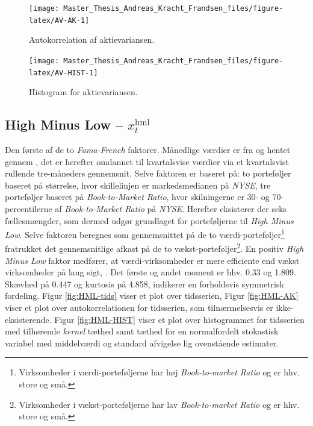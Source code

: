 \documentclass[
  a4paper,
  oneside]{memoir}
\begin{document}
\begin{figure}[H]

{\centering \texttt{[image: Master\_Thesis\_Andreas\_Kracht\_Frandsen\_files/figure-latex/AV-AK-1]} 

}

\caption{Autokorrelation af aktievariansen.}\label{fig:AV-AK}
\end{figure}

\begin{figure}[H]

{\centering \texttt{[image: Master\_Thesis\_Andreas\_Kracht\_Frandsen\_files/figure-latex/AV-HIST-1]} 

}

\caption{Histogram for aktievariansen.}\label{fig:AV-HIST}
\end{figure}

\hypertarget{datahml}{%
\subsection{\texorpdfstring{High Minus Low -- \(x_t^{\text{hml}}\)}{High Minus Low -- x\_t\^{}\{\textbackslash text\{hml\}\}}}\label{datahml}}

Den første af de to \emph{Fama-French} faktorer. Månedlige værdier er fra \citep{CRSPakt} og hentet gennem \citep{French2020}, det er herefter omdannet til kvartalsvise værdier via et kvartalsvist rullende tre-måneders gennemsnit. Selve faktoren er baseret på: to porteføljer baseret på størrelse, hvor skillelinjen er markedsmedianen på \emph{NYSE}, tre porteføljer baseret på \emph{Book-to-Market Ratio}, hvor skilningerne er \(30\)- og \(70\)-percentilerne af \emph{Book-to-Market Ratio} på \emph{NYSE}. Herefter eksisterer der seks fællesmængder, som dermed udgør grundlaget for porteføljerne til \emph{High Minus Low}. Selve faktoren beregnes som gennemsnittet på de to værdi-porteføljer\footnote{Virksomheder i værdi-porteføljerne har høj \emph{Book-to-market Ratio} og er hhv. store og små.} fratrukket det gennemsnitlige afkast på de to vækst-porteføljer\footnote{Virksomheder i vækst-porteføljerne har lav \emph{Book-to-market Ratio} og er hhv. store og små.}. En positiv \emph{High Minus Low} faktor medfører, at værdi-virksomheder er mere efficiente end vækst virksomheder på lang sigt, \citep{French1993}. Det første og andet moment er hhv. 0.33 og 1.809. Skævhed på 0.447 og kurtosis på 4.858, indikerer en forholdsvis symmetrisk fordeling. Figur \ref{fig:HML-tids} viser et plot over tidsserien, Figur \ref{fig:HML-AK} viser et plot over autokorrelationen for tidsserien, som tilnærmelsesvis er ikke-eksisterende. Figur \ref{fig:HML-HIST} viser et plot over histogrammet for tidsserien med tilhørende \emph{kernel} tæthed samt tæthed for en normalfordelt stokastisk variabel med middelværdi og standard afvigelse lig ovenstående estimater.
\end{document}
